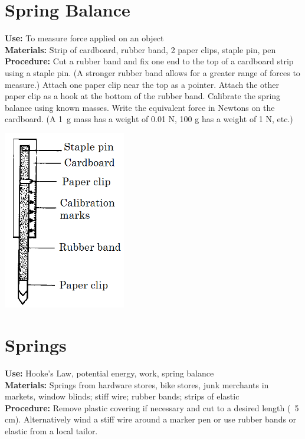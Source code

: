 \begin{multicols}{2}
\section{Spring Balance}
\label{sec:spring-balance}
\textbf{Use:} To measure force applied on an object\\
\textbf{Materials:} Strip of cardboard, rubber band, 2 paper clips, staple pin, pen\\
\textbf{Procedure:} Cut a rubber band and fix one end to the top of a cardboard strip using a staple pin. (A stronger rubber band allows for a greater range of forces to measure.) Attach one paper clip near the top as a pointer. Attach the other paper clip as a hook at the bottom of the rubber band. Calibrate the spring balance using known masses. Write the equivalent force in Newtons on the cardboard. (A 1~g mass has a weight of 0.01 N, 100 g has a weight of 1 N, etc.)
\begin{center}
\includegraphics[width=0.4\textwidth]{./img/source/spring-balance.png}
\end{center}

\section{Springs}
\label{sec:springs}
\vspace{-10pt}
\textbf{Use:} Hooke's Law, potential energy, work, spring balance\\
\textbf{Materials:} Springs from hardware stores, bike stores, junk merchants in markets, window blinds; stiff wire; rubber bands; strips of elastic\\
\textbf{Procedure:} Remove plastic covering if necessary and cut to a desired length (~5 cm). Alternatively wind a stiff wire around a marker pen or use rubber bands or elastic from a local tailor.


\end{multicols}
